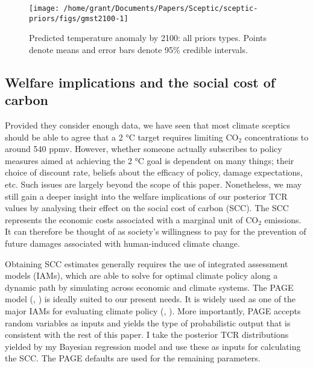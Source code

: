 \documentclass[smallextended]{svjour3}       %
\begin{document}
\begin{figure}

{\centering \texttt{[image: /home/grant/Documents/Papers/Sceptic/sceptic-priors/figs/gmst2100-1]} 

}

\caption{Predicted temperature anomaly by 2100: all priors types. Points denote means and error bars denote 95\% credible intervals.}\label{fig:gmst2100}
\end{figure}

\hypertarget{sec:welfare}{%
\subsection{Welfare implications and the social cost of
carbon}\label{sec:welfare}}

Provided they consider enough data, we have seen that most climate
sceptics should be able to agree that a 2 °C target requires limiting
CO\(_2\) concentrations to around 540 ppmv. However, whether someone
actually subscribes to policy measures aimed at achieving the 2 °C goal
is dependent on many things; their choice of discount rate, beliefs
about the efficacy of policy, damage expectations, etc. Such issues are
largely beyond the scope of this paper. Nonetheless, we may still gain a
deeper insight into the welfare implications of our posterior TCR values
by analysing their effect on the social cost of carbon (SCC). The SCC
represents the economic costs associated with a marginal unit of
CO\(_2\) emissions. It can therefore be thought of as society's
willingness to pay for the prevention of future damages associated with
human-induced climate change.

Obtaining SCC estimates generally requires the use of integrated
assessment models (IAMs), which are able to solve for optimal climate
policy along a dynamic path by simulating across economic and climate
systems. The PAGE model (\cite{hope2011page09},
\cite{hope2011page09scc}) is ideally suited to our present needs. It is
widely used as one of the major IAMs for evaluating climate policy
(\cite{nordhaus2014scc}, \cite{iwg2016scc}). More importantly, PAGE
accepts random variables as inputs and yields the type of probabilistic
output that is consistent with the rest of this paper. I take the
posterior TCR distributions yielded by my Bayesian regression model and
use these as inputs for calculating the SCC. The PAGE defaults are used
for the remaining parameters.
\end{document}
